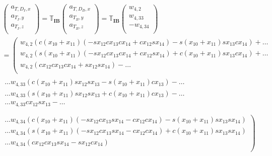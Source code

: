 \begin{multline} \label{eq:DandTInertial}
\begin{pmatrix}
a_{T,D_{I},x}\\
a_{T_{I},y}\\
a_{T_{I},z}\\
\end{pmatrix}
=
\mathbb{T}_{\mathbf{IB}}
\begin{pmatrix}
a_{T,D_{B},x}\\
a_{T_{B},y}\\
a_{T_{B},z}\\
\end{pmatrix}=
\mathbb{T}_{\mathbf{IB}}
\begin{pmatrix}
w_{4,2}\\
w_{4,33}\\
-w_{4,34}\\
\end{pmatrix}\\
=
\left(
\begin{matrix}
w_{4,2} \left( c\left(x_{10}+x_{11}\right)\left(-sx_{12} cx_{13} cx_{14} +cx_{12} sx_{14} \right)-s\left(x_{10}+x_{11}\right) sx_{13} cx_{14} \right)  + \dots  \\
w_{4,2} \left( s\left(x_{10}+x_{11}\right)\left(-sx_{12} cx_{13} cx_{14} +cx_{12} sx_{14} \right)+c\left(x_{10}+x_{11}\right) sx_{13} cx_{14}  \right)  + \dots \\
w_{4,2} \left(cx_{12} cx_{13} cx_{14} +sx_{12} sx_{14}  \right)  - \dots \\
\end{matrix} \right.
\\
\begin{matrix}
\dotsc  w_{4,33} \left( c\left(x_{10}+x_{11}\right) sx_{12} sx_{13} -s\left(x_{10}+x_{11}\right) cx_{13}\right)  - \dots \\
\dotsc  w_{4,33} \left( s\left(x_{10}+x_{11}\right) sx_{12} sx_{13} +c\left(x_{10}+x_{11}\right) cx_{13} \right)  - \dots \\
\dotsc  w_{4,33} cx_{12} sx_{13} - \dots \\
\end{matrix}
\\
\left.
\begin{matrix}
\dotsc w_{4,34} \left( c\left(x_{10}+x_{11}\right)\left(-sx_{12} cx_{13} sx_{14} -cx_{12} cx_{14} \right)-s\left(x_{10}+x_{11}\right) sx_{13} sx_{14} \right) \\
\dotsc w_{4,34} \left(s\left(x_{10}+x_{11}\right)\left(-sx_{12} cx_{13} sx_{14} -cx_{12} cx_{14} \right)+c\left(x_{10}+x_{11}\right) sx_{13} sx_{14} \right) \\
\dotsc w_{4,34} \left( cx_{12} cx_{13} sx_{14} -sx_{12} cx_{14} \right) \\
\end{matrix}
\right)\\
\end{multline}

